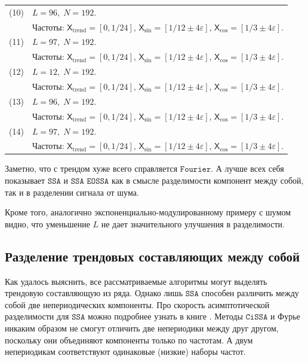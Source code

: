 \documentclass[12pt, specialist, subf
]{disser}
\theoremstyle{definition}
\newcommand{\SSA}{\texttt{SSA}}
\newcommand{\EOSSA}{\texttt{SSA EOSSA}}
\newcommand{\CISSA}{\texttt{CiSSA}}
\newcommand{\FOURIER}{\texttt{Fourier}}
\newcommand{\TS}{\mathsf{X}}
\begin{document}
\begin{table}[H]
\begin{tabularx}{\textwidth}{|c|X|}
    \hline
    (10) & \(L = 96,\; N = 192\). \\
         & Частоты: \(\TS_{\text{trend}} = [0,1/24]\), \(\TS_{\sin} = [1/12\pm4\varepsilon]\), \(\TS_{\cos} = [1/3\pm4\varepsilon]\). \\
    \hline
    (11) & \(L = 97,\; N = 192\). \\
         & Частоты: \(\TS_{\text{trend}} = [0,1/24]\), \(\TS_{\sin} = [1/12\pm4\varepsilon]\), \(\TS_{\cos} = [1/3\pm4\varepsilon]\). \\
    \hline
    (12) & \(L = 12,\; N = 192\). \\
         & Частоты: \(\TS_{\text{trend}} = [0,1/24]\), \(\TS_{\sin} = [1/12\pm4\varepsilon]\), \(\TS_{\cos} = [1/3\pm4\varepsilon]\). \\
    \hline
    (13) & \(L = 96,\; N = 192\). \\
         & Частоты: \(\TS_{\text{trend}} = [0,1/24]\), \(\TS_{\sin} = [1/12\pm4\varepsilon]\), \(\TS_{\cos} = [1/3\pm4\varepsilon]\). \\
    \hline
    (14) & \(L = 97,\; N = 192\). \\
         & Частоты: \(\TS_{\text{trend}} = [0,1/24]\), \(\TS_{\sin} = [1/12\pm4\varepsilon]\), \(\TS_{\cos} = [1/3\pm4\varepsilon]\). \\
    \hline
  \end{tabularx}
\end{table}


Заметно, что с трендом хуже всего справляется $\FOURIER$. А лучше всех себя показывает $\SSA$ и $\EOSSA$ как в смысле разделимости компонент между собой, так и в разделении сигнала от шума.

Кроме того,   аналогично экспоненциально-модулированному примеру с шумом видно, что уменьшение $L$ не дает значительного улучшения в разделимости.


\subsection{Разделение трендовых составляющих между собой}
\label{subsubsec:nonperiodic}

Как удалось выяснить, все рассматриваемые алгоритмы могут выделять трендовую составляющую из ряда. Однако лишь $\SSA$ способен различить между собой две непериодических компоненты. Про скорость асимптотической разделимости для $\SSA$ можно подробнее узнать в книге \cite{golyandina2001analysis}. Методы $\CISSA$ и Фурье никаким образом не смогут отличить две непериодики между друг другом, поскольку они объединяют компоненты только по частотам. А двум непериодикам соответствуют одинаковые (низкие) наборы частот.
\end{document}

